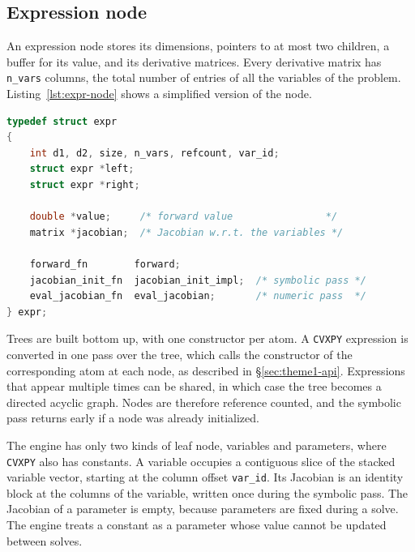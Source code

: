 \subsection{Expression node}\label{sec:theme1-expression-node}
An expression node stores its dimensions, pointers to at most two children, a buffer for
its value, and its derivative matrices. Every derivative matrix has \texttt{n\_vars}
columns, the total number of entries of all the variables of the problem.
Listing~\ref{lst:expr-node} shows a simplified version of the node.
\begin{lstlisting}[language=C, caption={A simplified version of the expression
node in \texttt{expr.h}.}, label=lst:expr-node]
typedef struct expr
{
    int d1, d2, size, n_vars, refcount, var_id;
    struct expr *left;
    struct expr *right;

    double *value;     /* forward value                */
    matrix *jacobian;  /* Jacobian w.r.t. the variables */

    forward_fn        forward;
    jacobian_init_fn  jacobian_init_impl;  /* symbolic pass */
    eval_jacobian_fn  eval_jacobian;       /* numeric pass  */
} expr;
\end{lstlisting}
Trees are built bottom up, with one constructor per atom. A \texttt{CVXPY} expression
is converted in one pass over the tree, which calls the constructor of the corresponding atom
at each node, as described in \S\ref{sec:theme1-api}. Expressions that appear multiple times
can be shared, in which case the tree becomes a directed acyclic graph. Nodes are therefore
reference counted, and the symbolic pass returns early if a node was already initialized.

The engine has only two kinds of leaf node, variables and parameters, where \texttt{CVXPY}
also has constants. A variable occupies a contiguous slice of the stacked variable vector,
starting at the column offset \texttt{var\_id}. Its Jacobian is an identity block at the
columns of the variable, written once during the symbolic pass. The Jacobian of a parameter
is empty, because parameters are fixed during a solve. The engine treats a constant as a
parameter whose value cannot be updated between solves.


